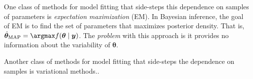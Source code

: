 One class of methods for model fitting that side-steps this dependence on 
    samples of parameters is \emph{expectation maximization} (EM)\needcite.
    In Bayesian inference, the goal of EM is to find the set of parameters
    that maximizes posterior density.  That is, 
    $\hat{\bm{\theta}}_{\text{MAP}} = \argmax f(\bm{\theta}\mid \bm{y})$.
    The \emph{problem} with this approach is it provides no information about
    the variability of $\bm{\theta}$.

Another class of methods for model fitting that side-steps the dependence on
    samples is variational methods..








